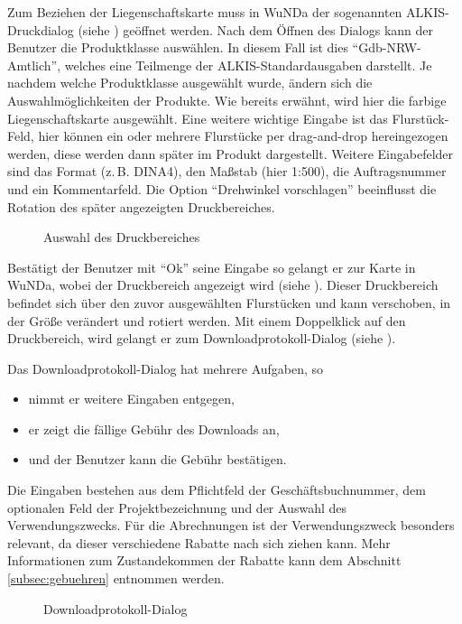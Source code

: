 Zum Beziehen der Liegenschaftskarte muss in \ac{WuNDa} der sogenannten ALKIS-Druckdialog (siehe ) geöffnet werden.
Nach dem Öffnen des Dialogs kann der Benutzer die Produktklasse auswählen. In diesem Fall ist dies "`Gdb-NRW-Amtlich"', welches eine Teilmenge der ALKIS-Standardausgaben darstellt. 
Je nachdem welche Produktklasse ausgewählt wurde, ändern sich die Auswahlmöglichkeiten der Produkte.
Wie bereits erwähnt, wird hier die farbige Liegenschaftskarte ausgewählt.
Eine weitere wichtige Eingabe ist das Flurstück-Feld, hier können ein oder mehrere Flurstücke per drag-and-drop hereingezogen werden, diese werden dann später im Produkt dargestellt.
Weitere Eingabefelder sind das Format (z.\,B. DINA4), den  Maßstab (hier 1:500), die Auftragsnummer und ein Kommentarfeld. Die Option "`Drehwinkel vorschlagen"' beeinflusst die Rotation des später angezeigten Druckbereiches.

\begin{figure}[htb]
	\centering
	\caption{Auswahl des Druckbereiches}
	\label{fig:alkis-auswahl}
\end{figure}

Bestätigt der Benutzer mit "`Ok"' seine Eingabe so gelangt er zur Karte in \ac{WuNDa}, wobei der Druckbereich angezeigt wird (siehe ).
Dieser Druckbereich befindet sich über den zuvor ausgewählten Flurstücken und kann verschoben, in der Größe verändert und rotiert werden.
Mit einem Doppelklick auf den Druckbereich, wird gelangt er zum Downloadprotokoll-Dialog (siehe ).  

Das Downloadprotokoll-Dialog hat mehrere Aufgaben, so 
\begin{itemize}
\item nimmt er weitere Eingaben entgegen,
\item er zeigt die fällige Gebühr des Downloads an,
\item und der Benutzer kann die Gebühr bestätigen.
\end{itemize}

Die Eingaben bestehen aus dem Pflichtfeld der Geschäftsbuchnummer, dem optionalen Feld der Projektbezeichnung und der Auswahl des Verwendungszwecks.
Für die Abrechnungen ist der Verwendungszweck besonders relevant, da dieser verschiedene Rabatte nach sich ziehen kann. Mehr Informationen zum Zustandekommen der Rabatte kann dem Abschnitt \ref{subsec:gebuehren} entnommen werden.

\begin{figure}[htb]
	\centering
	\caption{Downloadprotokoll-Dialog}
	\label{fig:alkis-protocol}
\end{figure}

